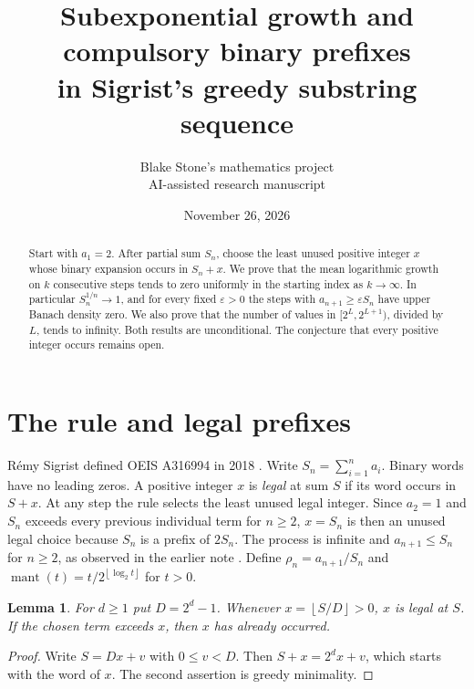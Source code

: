 \documentclass[11pt]{article}
\title{Subexponential growth and compulsory binary prefixes\\in Sigrist's greedy substring sequence}
\author{Blake Stone's mathematics project\\\small AI-assisted research manuscript}
\date{November 26, 2026}
\newtheorem{lemma}[theorem]{Lemma}
\newcommand{\fl}[1]{\left\lfloor#1\right\rfloor}
\newcommand{\mant}{\operatorname{mant}}
\begin{document}
\maketitle
\begin{abstract}
Start with $a_1=2$. After partial sum $S_n$, choose the least unused positive integer $x$ whose binary expansion occurs in $S_n+x$. We prove that the mean logarithmic growth on $k$ consecutive steps tends to zero uniformly in the starting index as $k\to\infty$. In particular $S_n^{1/n}\to1$, and for every fixed $\varepsilon>0$ the steps with $a_{n+1}\ge\varepsilon S_n$ have upper Banach density zero. We also prove that the number of values in $[2^L,2^{L+1})$, divided by $L$, tends to infinity. Both results are unconditional. The conjecture that every positive integer occurs remains open.
\end{abstract}

\section{The rule and legal prefixes}
R\'emy Sigrist defined OEIS A316994 in 2018 \cite{oeis}. Write $S_n=\sum_{i=1}^n a_i$. Binary words have no leading zeros. A positive integer $x$ is \emph{legal} at sum $S$ if its word occurs in $S+x$. At any step the rule selects the least unused legal integer. Since $a_2=1$ and $S_n$ exceeds every previous individual term for $n\ge2$, $x=S_n$ is then an unused legal choice because $S_n$ is a prefix of $2S_n$. The process is infinite and $a_{n+1}\le S_n$ for $n\ge2$, as observed in the earlier note \cite{previous}. Define $\rho_n=a_{n+1}/S_n$ and $\mant(t)=t/2^{\fl{\log_2 t}}$ for $t>0$.

\begin{lemma}\label{lem:prefix}
For $d\ge1$ put $D=2^d-1$. Whenever $x=\fl{S/D}>0$, $x$ is legal at $S$. If the chosen term exceeds $x$, then $x$ has already occurred.
\end{lemma}
\begin{proof}
Write $S=Dx+v$ with $0\le v<D$. Then $S+x=2^d x+v$, which starts with the word of $x$. The second assertion is greedy minimality.
\end{proof}
\end{document}
